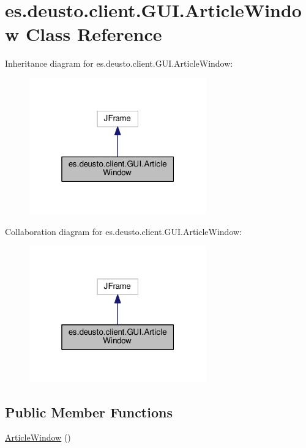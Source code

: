 \hypertarget{classes_1_1deusto_1_1client_1_1_g_u_i_1_1_article_window}{}\section{es.\+deusto.\+client.\+G\+U\+I.\+Article\+Window Class Reference}
\label{classes_1_1deusto_1_1client_1_1_g_u_i_1_1_article_window}


Inheritance diagram for es.\+deusto.\+client.\+G\+U\+I.\+Article\+Window\+:
\nopagebreak
\begin{figure}[H]
\begin{center}
\leavevmode
\includegraphics[width=217pt]{classes_1_1deusto_1_1client_1_1_g_u_i_1_1_article_window__inherit__graph}
\end{center}
\end{figure}


Collaboration diagram for es.\+deusto.\+client.\+G\+U\+I.\+Article\+Window\+:
\nopagebreak
\begin{figure}[H]
\begin{center}
\leavevmode
\includegraphics[width=217pt]{classes_1_1deusto_1_1client_1_1_g_u_i_1_1_article_window__coll__graph}
\end{center}
\end{figure}
\subsection*{Public Member Functions}
\begin{DoxyCompactItemize}
\item 
\hyperlink{classes_1_1deusto_1_1client_1_1_g_u_i_1_1_article_window_a32785c5a8d12fccb60c87c7dacf53e7f}{Article\+Window} ()
\end{DoxyCompactItemize}


